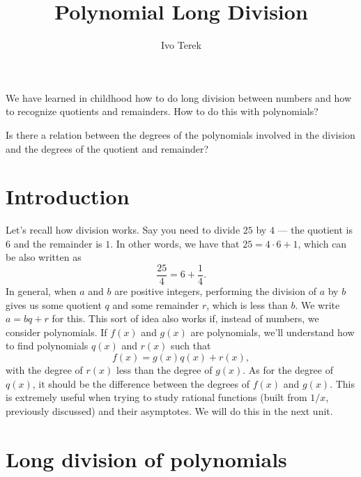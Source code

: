 \documentclass{ximera}
\author{Ivo Terek}
\title{Polynomial Long Division}
\begin{document}
\begin{abstract}
\end{abstract}
\maketitle


\begin{motivatingQuestions}
\item We have learned in childhood how to do long division between numbers and how to recognize quotients and remainders. How to do this with polynomials?
\item Is there a relation between the degrees of the polynomials involved in the division and the degrees of the quotient and remainder?
\end{motivatingQuestions}



\section{Introduction}

Let's recall how division works. Say you need to divide $25$ by $4$ --- the quotient is $6$ and the remainder is $1$. In other words, we have that $25 = 4\cdot 6 + 1$, which can be also written as $$  \frac{25}{4} = 6+\frac{1}{4}. $$In general, when $a$ and $b$ are positive integers, performing the division of $a$ by $b$ gives us some quotient $q$ and some remainder $r$, which is less than $b$. We write $a = bq+r$ for this. This sort of idea also works if, instead of numbers, we consider polynomials. If $f(x)$ and $g(x)$ are polynomials, we'll understand how to find polynomials $q(x)$ and $r(x)$ such that $$  f(x) = g(x)q(x)+r(x),  $$with the degree of $r(x)$ less than the degree of $g(x)$. As for the degree of $q(x)$, it should be the difference between the degrees of $f(x)$ and $g(x)$. This is extremely useful when trying to study rational functions (built from $1/x$, previously discussed) and their asymptotes. We will do this in the next unit.

\section{Long division of polynomials}
\end{document}
